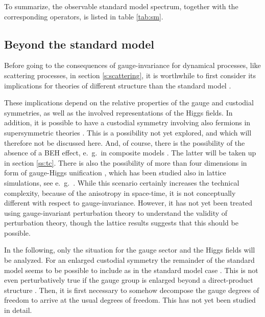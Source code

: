 \documentclass[final,12pt,3p,longtitle]{elsarticle}
\newcommand*{\1}{1\!\!\!\bot}
\begin{document}
To summarize, the observable standard model spectrum, together with the corresponding operators, is listed in table \ref{tab:sm}.

\subsection{Beyond the standard model}\label{ss:bsm}

Before going to the consequences of gauge-invariance for dynamical processes, like scattering processes, in section \ref{s:scattering}, it is worthwhile to first consider its implications for theories of different structure than the standard model \cite{Maas:2015gma}.

These implications depend on the relative properties of the gauge and custodial symmetries, as well as the involved representations of the Higgs fields. In addition, it is possible to have a custodial symmetry involving also fermions in supersymmetric theories \cite{Morrissey:2009tf,Aitchison:2007fn}. This is a possibility not yet explored, and which will therefore not be discussed here. And, of course, there is the possibility of the absence of a BEH effect, e.\ g.\ in composite models \cite{Hill:2002ap,Andersen:2011yj,Sannino:2009za,Sannino:2008ha,Morrissey:2009tf,DeGrand:2015zxa}. The latter will be taken up in section \ref{ss:tc}. There is also the possibility of more than four dimensions in form of gauge-Higgs unification \cite{Morrissey:2009tf}, which has been studied also in lattice simulations, see e.\ g.\ \cite{Lang:1986kq,Knechtli:2016pph,Alberti:2015pha,Irges:2013rya,Irges:2012mp}. While this scenario certainly increases the technical complexity, because of the anisotropy in space-time, it is not conceptually different with respect to gauge-invariance. However, it has not yet been treated using gauge-invariant perturbation theory to understand the validity of perturbation theory, though the lattice results suggests \cite{Alberti:2015pha,Knechtli:2016pph} that this should be possible.

In the following, only the situation for the gauge sector and the Higgs fields will be analyzed. For an enlarged custodial symmetry the remainder of the standard model seems to be possible to include as in the standard model case \cite{Maas:2016qpu}. This is not even perturbatively true if the gauge group is enlarged beyond a direct-product structure \cite{Bohm:2001yx,Langacker:1980js}. Then, it is first necessary to somehow decompose the gauge degrees of freedom to arrive at the usual degrees of freedom. This has not yet been studied in detail.
\end{document}
